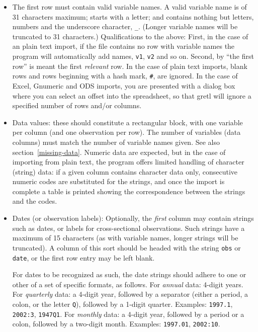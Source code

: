 \begin{itemize}

\item The first row must contain valid variable names.  A valid
  variable name is of 31 characters maximum; starts with a letter; and
  contains nothing but letters, numbers and the underscore character,
  \verb+_+.  (Longer variable names will be truncated to 31
  characters.)  Qualifications to the above: First, in the case of an
  plain text import, if the file contains no row with variable names
  the program will automatically add names, \verb+v1+, \verb+v2+ and
  so on.  Second, by ``the first row'' is meant the first
  \emph{relevant} row.  In the case of plain text imports, blank
  rows and rows beginning with a hash mark, \verb+#+, are ignored.  In
  the case of Excel, Gnumeric and ODS imports, you are presented with a
  dialog box where you can select an offset into the spreadsheet, so
  that gretl will ignore a specified number of rows and/or
  columns.
          
\item Data values: these should constitute a rectangular block, with
  one variable per column (and one observation per row).  The number
  of variables (data columns) must match the number of variable names
  given. See also section~\ref{missing-data}.  Numeric data are
  expected, but in the case of importing from plain text, the program
  offers limited handling of character (string) data: if a given
  column contains character data only, consecutive numeric codes are
  substituted for the strings, and once the import is complete a table
  is printed showing the correspondence between the strings and the
  codes.
          
\item Dates (or observation labels): Optionally, the \emph{first}
  column may contain strings such as dates, or labels for
  cross-sectional observations.  Such strings have a maximum of 15
  characters (as with variable names, longer strings will be
  truncated).  A column of this sort should be headed with the string
  \verb+obs+ or \verb+date+, or the first row entry may be left
  blank.

  For dates to be recognized as such, the date strings should adhere
  to one or other of a set of specific formats, as follows.  For
  \emph{annual} data: 4-digit years.  For \emph{quarterly} data: a
  4-digit year, followed by a separator (either a period, a colon, or
  the letter \verb+Q+), followed by a 1-digit quarter.  Examples:
  \verb+1997.1+, \verb+2002:3+, \verb+1947Q1+.  For \emph{monthly}
  data: a 4-digit year, followed by a period or a colon, followed by a
  two-digit month.  Examples: \verb+1997.01+, \verb+2002:10+.
          
\end{itemize}

